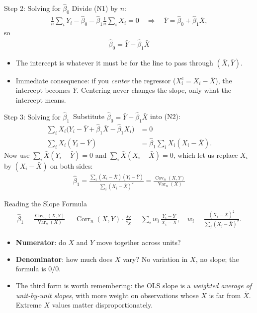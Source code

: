 \documentclass[aspectratio=169,11pt,xcolor=dvipsnames]{beamer}
\DeclareMathOperator{\Cov}{Cov}
\DeclareMathOperator{\Var}{Var}
\DeclareMathOperator{\Corr}{Corr}
\newcommand{\core}{\,\raisebox{0.6pt}{\textcolor{corestar}{$\bigstar$}}}
\begin{document}
\begin{frame}{Step 2: Solving for $\hat\beta_0$}
Divide (N1) by $n$:
\begin{align*}
  \frac{1}{n}\sum_i Y_i - \hat\beta_0 - \hat\beta_1 \frac1n\sum_i X_i = 0
  \quad\Longrightarrow\quad
  \bar Y = \hat\beta_0 + \hat\beta_1 \bar X ,
\end{align*}
so
\begin{align*}
  \boxed{\;\hat\beta_0 = \bar Y - \hat\beta_1 \bar X\;}
\end{align*}
\vskip6pt
\begin{itemize}
  \item The intercept is whatever it must be for the line to pass through
        $(\bar X, \bar Y)$.
  \item Immediate consequence: if you \emph{center} the regressor
        ($X_i^c = X_i - \bar X$), the intercept becomes $\bar Y$. Centering never
        changes the slope, only what the intercept means.
\end{itemize}
\end{frame}

\begin{frame}{Step 3: Solving for $\hat\beta_1$\core}
Substitute $\hat\beta_0 = \bar Y - \hat\beta_1\bar X$ into (N2):
\begin{align*}
  \sum_i X_i\Big(Y_i - \bar Y + \hat\beta_1\bar X - \hat\beta_1 X_i\Big) &= 0 \\
  \sum_i X_i (Y_i - \bar Y) &= \hat\beta_1 \sum_i X_i (X_i - \bar X) .
\end{align*}
\pause
Now use $\sum_i \bar X (Y_i - \bar Y) = 0$ and $\sum_i \bar X(X_i - \bar X) = 0$,
which let us replace $X_i$ by $(X_i - \bar X)$ on both sides:
\begin{align*}
  \boxed{\;\hat\beta_1
  = \frac{\sum_i (X_i - \bar X)(Y_i - \bar Y)}{\sum_i (X_i - \bar X)^2}
  = \frac{\Cov_n(X,Y)}{\Var_n(X)}\;}
\end{align*}
\end{frame}

\begin{frame}{Reading the Slope Formula\core}
\begin{align*}
  \hat\beta_1
  = \frac{\Cov_n(X,Y)}{\Var_n(X)}
  = \Corr_n(X,Y)\cdot\frac{s_Y}{s_X}
  = \sum_{i} w_i \,\frac{Y_i - \bar Y}{X_i - \bar X},
  \quad w_i = \frac{(X_i-\bar X)^2}{\sum_j (X_j - \bar X)^2} .
\end{align*}
\begin{itemize}\itemsep5pt
  \item \textbf{Numerator}: do $X$ and $Y$ move together across units?
  \item \textbf{Denominator}: how much does $X$ vary? \alert{No variation in $X$,
        no slope}; the formula is $0/0$.
  \item The third form is worth remembering: the OLS slope is a
        \emph{weighted average of unit-by-unit slopes}, with more weight on
        observations whose $X$ is far from $\bar X$. Extreme $X$ values matter
        disproportionately.
\end{itemize}
\end{frame}
\end{document}
